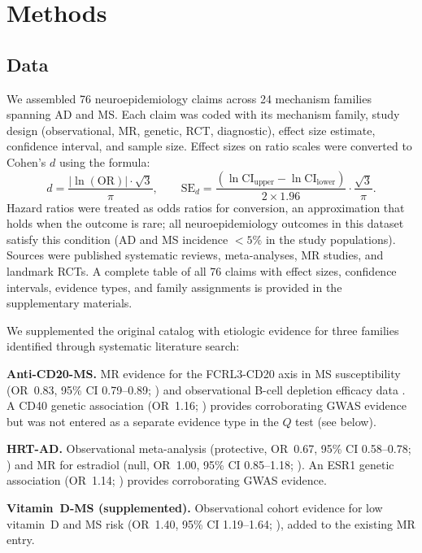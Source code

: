 \documentclass[11pt]{article}
\begin{document}
\section{Methods}

\subsection{Data}

We assembled 76 neuroepidemiology claims across 24 mechanism families spanning AD and MS. Each claim was coded with its mechanism family, study design (observational, MR, genetic, RCT, diagnostic), effect size estimate, confidence interval, and sample size. Effect sizes on ratio scales were converted to Cohen's $d$ using the \citet{chinn2000} formula:
\begin{equation}
d = \frac{|\ln(\text{OR})| \cdot \sqrt{3}}{\pi}, \qquad
\text{SE}_d = \frac{(\ln\text{CI}_{\text{upper}} - \ln\text{CI}_{\text{lower}})}{2 \times 1.96} \cdot \frac{\sqrt{3}}{\pi}.
\label{eq:chinn}
\end{equation}
Hazard ratios were treated as odds ratios for conversion, an approximation that holds when the outcome is rare; all neuroepidemiology outcomes in this dataset satisfy this condition (AD and MS incidence $< 5\%$ in the study populations). Sources were published systematic reviews, meta-analyses, MR studies, and landmark RCTs. A complete table of all 76 claims with effect sizes, confidence intervals, evidence types, and family assignments is provided in the supplementary materials.

We supplemented the original catalog with etiologic evidence for three families identified through systematic literature search:

\textbf{Anti-CD20-MS.} MR evidence for the FCRL3-CD20 axis in MS susceptibility (OR~0.83, 95\% CI 0.79--0.89; \citealp{lin2023}) and observational B-cell depletion efficacy data \citep{hu2019}. A CD40 genetic association (OR~1.16; \citealp{sokolova2013}) provides corroborating GWAS evidence but was not entered as a separate evidence type in the $Q$ test (see below).

\textbf{HRT-AD.} Observational meta-analysis (protective, OR~0.67, 95\% CI 0.58--0.78; \citealp{song2020}) and MR for estradiol (null, OR~1.00, 95\% CI 0.85--1.18; \citealp{barth2025}). An ESR1 genetic association (OR~1.14; \citealp{cheng2014}) provides corroborating GWAS evidence.

\textbf{Vitamin~D-MS (supplemented).} Observational cohort evidence for low vitamin~D and MS risk (OR~1.40, 95\% CI 1.19--1.64; \citealp{munger2006}), added to the existing MR entry.
\end{document}
